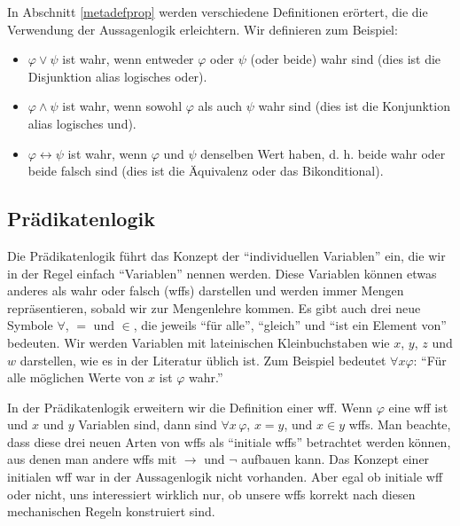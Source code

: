 In Abschnitt \ref{metadefprop} werden verschiedene Definitionen erörtert, die die Verwendung der Aussagenlogik erleichtern. Wir definieren zum Beispiel:

\begin{itemize}
\item $\varphi \vee \psi$ ist wahr, wenn entweder $\varphi$ oder $\psi$ (oder beide) wahr sind (dies ist die Disjunktion alias logisches {\sc oder}).

\item $\varphi \wedge \psi$ ist wahr, wenn sowohl $\varphi$ als auch $\psi$ wahr sind (dies ist die Konjunktion alias logisches {\sc und}).

\item $\varphi \leftrightarrow \psi$ ist wahr, wenn $\varphi$ und $\psi$ denselben Wert haben, d. h. beide wahr oder beide falsch sind (dies ist die Äquivalenz oder das Bikonditional).
\end{itemize}

\subsection{Prädikatenlogik}

Die Prädikatenlogik führt das Konzept der "`individuellen Variablen"' ein, die wir in der Regel einfach "`Variablen"' nennen werden. Diese Variablen können etwas anderes als wahr oder falsch (wffs) darstellen und werden immer Mengen repräsentieren, sobald wir zur Mengenlehre kommen.  Es gibt auch drei neue Symbole $\forall$, $=$ und $\in$, die jeweils "`für alle"', "`gleich"' und "`ist ein Element von"' bedeuten.  Wir werden Variablen mit lateinischen Kleinbuchstaben wie  $x$, $y$, $z$ und $w$ darstellen, wie es in der Literatur üblich ist. Zum Beispiel bedeutet $\forall x \varphi$: "`Für alle möglichen Werte von $x$ ist $\varphi$ wahr."'

In der Prädikatenlogik erweitern wir die Definition einer wff.  Wenn $\varphi$ eine wff ist und $x$ und $y$ Variablen sind, dann sind $\forall x \, \varphi$, $x=y$, und $x\in y$ wffs. Man beachte, dass diese drei neuen Arten von wffs als "`initiale wffs"' betrachtet werden können, aus denen man andere wffs mit $\rightarrow$ und $\neg$ aufbauen kann.  Das Konzept einer initialen wff war in der Aussagenlogik nicht vorhanden.  Aber egal ob initiale wff oder nicht, uns interessiert wirklich nur, ob unsere wffs korrekt nach diesen mechanischen Regeln konstruiert sind.

